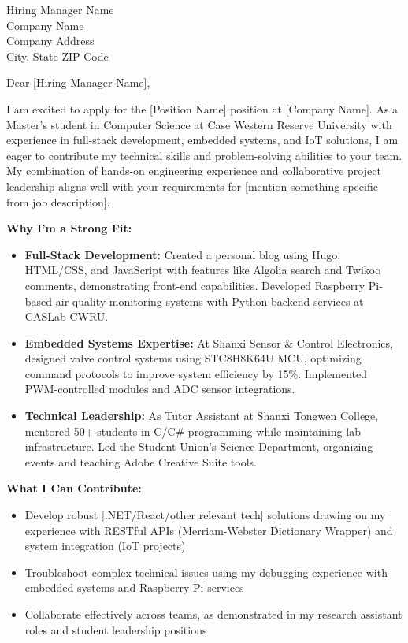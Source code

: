 \documentclass{letter}
\date{\today}
\begin{document}
\begin{letter}{
        Hiring Manager Name \\
        Company Name \\
        Company Address \\
        City, State ZIP Code
    }

    \opening{Dear [Hiring Manager Name],}

    I am excited to apply for the [Position Name] position at [Company Name]. As a Master's student in Computer Science at Case Western Reserve University with experience in full-stack development, embedded systems, and IoT solutions, I am eager to contribute my technical skills and problem-solving abilities to your team. My combination of hands-on engineering experience and collaborative project leadership aligns well with your requirements for [mention something specific from job description].

    \textbf{Why I'm a Strong Fit:}

    \begin{itemize}
        \item \textbf{Full-Stack Development:} Created a personal blog using Hugo, HTML/CSS, and JavaScript with features like Algolia search and Twikoo comments, demonstrating front-end capabilities. Developed Raspberry Pi-based air quality monitoring systems with Python backend services at CASLab CWRU.

        \item \textbf{Embedded Systems Expertise:} At Shanxi Sensor \& Control Electronics, designed valve control systems using STC8H8K64U MCU, optimizing command protocols to improve system efficiency by 15\%. Implemented PWM-controlled modules and ADC sensor integrations.

        \item \textbf{Technical Leadership:} As Tutor Assistant at Shanxi Tongwen College, mentored 50+ students in C/C\# programming while maintaining lab infrastructure. Led the Student Union's Science Department, organizing events and teaching Adobe Creative Suite tools.
    \end{itemize}

    \textbf{What I Can Contribute:}
    \begin{itemize}
        \item Develop robust [.NET/React/other relevant tech] solutions drawing on my experience with RESTful APIs (Merriam-Webster Dictionary Wrapper) and system integration (IoT projects)
        \item Troubleshoot complex technical issues using my debugging experience with embedded systems and Raspberry Pi services
        \item Collaborate effectively across teams, as demonstrated in my research assistant roles and student leadership positions
    \end{itemize}


\end{letter}
\end{document}
